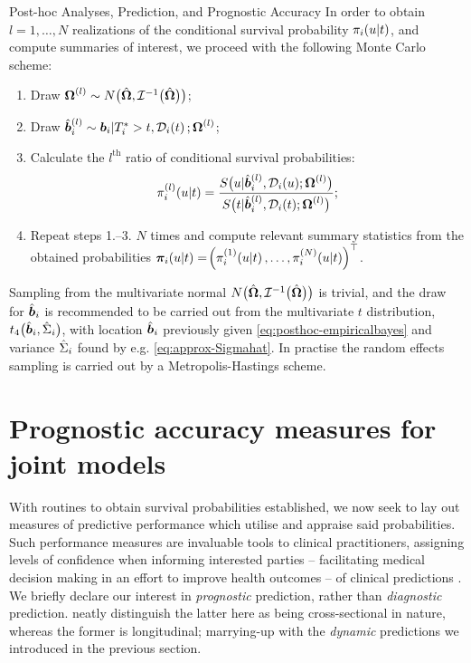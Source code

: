 \begin{chapter}{\label{cha:posthoc}Post-hoc Analyses, Prediction, and Prognostic Accuracy}
In order to obtain $l=1,\dots,N$ realizations of the conditional survival probability $\pi_i\!\left( u|t\right)$, and compute summaries of interest, we proceed with the following Monte Carlo scheme:
\begin{enumerate}
    \item Draw $\bm{\mathrm{\Omega}}^{(l)}\sim N\big(\hat{\bm{\Omega}},\mathcal{I}^{-1}\big(\hat{\bm{\Omega}}\big)\big)$;
    \item Draw $\hat{\bm{b}}_i^{(l)}\sim \bm{b}_i|T_i^*>t,\mathcal{D}_i\!\left( t\right);\bm{\mathrm{\Omega}}^{(l)}$;
    \item Calculate the $l^{\mathrm{th}}$ ratio of conditional survival probabilities:
    \begin{equation*}
        \pi_i^{(l)}\!\left( u|t\right)=\frac{S\big(u|\hat{\bm{b}}_i^{(l)},\mathcal{D}_i(u); \bm{\mathrm{\Omega}}^{(l)}\big)}{S\big(t|\hat{\bm{b}}_i^{(l)},\mathcal{D}_i(t); \bm{\mathrm{\Omega}}^{(l)}\big)};
    \end{equation*}
    \item Repeat steps 1.--3. $N$ times and compute relevant summary statistics from the obtained probabilities $\bm{\pi}_i\!\left( u|t\right)=\!\left(\pi^{(1)}_i\!\left( u|t\right),\dots,\pi^{(N)}_i\!\left( u|t\right)\right)^\top$.
\end{enumerate}

Sampling from the multivariate normal $N\big(\hat{\bm{\Omega}},\mathcal{I}^{-1}\big(\hat{\bm{\Omega}}\big)\big)$ is trivial, and the draw for $\hat{\bm{b}}_i$ is recommended to be carried out from the multivariate $t$ distribution, $t_4\big(\hat{\bm{b}}_i,\hat{\Sigma}_i\big)$, with location $\hat{\bm{b}}_i$ previously given \eqref{eq:posthoc-empiricalbayes} and variance $\hat{\Sigma}_i$ found by e.g. \eqref{eq:approx-Sigmahat}. In practise the random effects sampling is carried out by a Metropolis-Hastings scheme.

\section{Prognostic accuracy measures for joint models}\label{sec:posthoc-prognostics}
With routines to obtain survival probabilities established, we now seek to lay out measures of predictive performance which utilise and appraise said probabilities. Such performance measures are invaluable tools to \eg clinical practitioners, assigning levels of confidence when informing interested parties -- facilitating medical decision making in an effort to improve health outcomes -- of clinical predictions \citep{vanSmeden2021}. We briefly declare our interest in \textit{prognostic} prediction, rather than \textit{diagnostic} prediction. \citet{vanSmeden2021} neatly distinguish the latter here as being cross-sectional in nature, whereas the former is longitudinal; marrying-up with the \textit{dynamic} predictions we introduced in the previous section.


\end{chapter}
